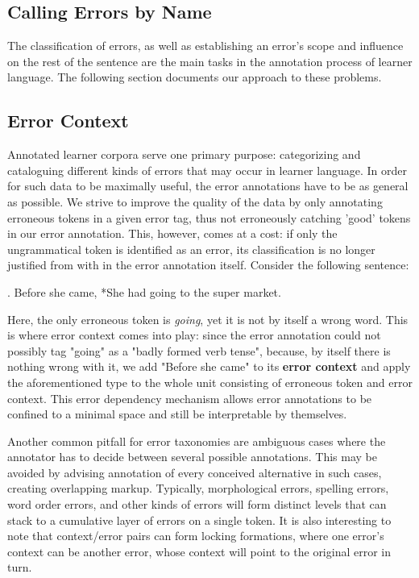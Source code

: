 \documentclass[12pt]{article}
\begin{document}
\subsection{Calling Errors by Name}\label{sec:taxonomy}

The classification of errors, as well as establishing an error's scope and 
influence on the rest of the sentence are the main tasks in the annotation
process of learner language. The following section documents our approach to
these problems.

\subsection{Error Context}

Annotated learner corpora serve one primary purpose: categorizing and
cataloguing different kinds of errors that may occur in learner language. In
order for such data to be maximally useful, the error annotations have to be as
general as possible. We strive to improve the quality of the data by only
annotating erroneous tokens in a given error tag, thus not erroneously catching
'good' tokens in our error annotation. This, however, comes at a cost: if only
the ungrammatical token is identified as an error, its classification is no
longer justified from with in the error annotation itself. Consider the
following sentence:

\ex. Before she came, *She had going to the super market.

Here, the only erroneous token is \textit{going}, yet it is not by itself a
wrong word. This is where error context comes into play: since the error
annotation could not possibly tag "going" as a "badly formed verb tense", because, by
itself there is nothing wrong with it, we add "Before she came" to its
\textbf{error context} and apply the aforementioned type to the whole unit
consisting of erroneous token and error context. This error dependency mechanism
allows error annotations to be confined to a minimal space and still be
interpretable by themselves.

Another common pitfall for error taxonomies are ambiguous cases where the
annotator has to decide between several possible annotations. This may be
avoided by advising annotation of every conceived alternative in such cases,
creating overlapping markup. Typically, morphological errors, spelling errors,
word order errors, and other kinds of errors will form distinct levels that can
stack to a cumulative layer of errors on a single token. It is also interesting
to note that context/error pairs can form locking formations, where one error's
context can be another error, whose context will point to the original error in
turn.
\end{document}

